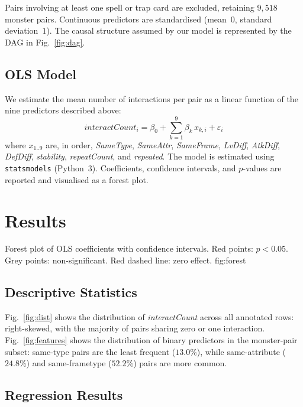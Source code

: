 \documentclass[10pt, a4paper]{article}
\begin{document}
Pairs involving at least one spell or trap card are excluded,
retaining $9{,}518$ monster pairs. Continuous predictors are
standardised (mean~$0$, standard deviation~$1$). The causal
structure assumed by our model is represented by the DAG in
Fig.~\ref{fig:dag}.

\subsection{OLS Model}

We estimate the mean number of interactions per pair as a linear
function of the nine predictors described above:
\begin{equation}
  \textit{interactCount}_i
    = \beta_0 + \sum_{k=1}^{9}\beta_k\,x_{k,i} + \varepsilon_i
  \label{eq:ols}
\end{equation}
where $x_{1..9}$ are, in order, \textit{SameType}, \textit{SameAttr},
\textit{SameFrame}, \textit{LvDiff}, \textit{AtkDiff},
\textit{DefDiff}, \textit{stability}, \textit{repeatCount}, and
\textit{repeated}. The model is estimated using \texttt{statsmodels}
(Python~$3$). Coefficients, confidence intervals, and
$p$-values are reported and visualised as a forest plot.

\section{Results}

  {Forest plot of OLS coefficients with confidence intervals.
   Red points: $p < 0.05$. Grey points: non-significant.
   Red dashed line: zero effect.}
  {fig:forest}

\subsection{Descriptive Statistics}

Fig.~\ref{fig:dist} shows the distribution of \textit{interactCount}
across all annotated rows: right-skewed, with the majority of pairs
sharing zero or one interaction. Fig.~\ref{fig:features} shows the
distribution of binary predictors in the monster-pair subset:
same-type pairs are the least frequent ($13.0\%$), while
same-attribute ($24.8\%$) and same-frametype ($52.2\%$) pairs are
more common.

\subsection{Regression Results}
\end{document}
